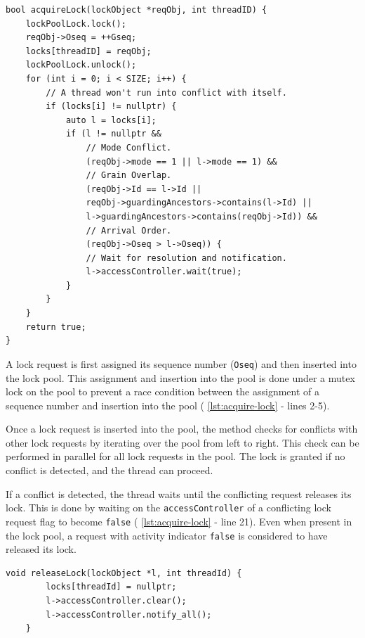 \begin{lstlisting}[caption={Acquiring a lock on \texttt{reqObj}}, label={lst:acquire-lock}]
bool acquireLock(lockObject *reqObj, int threadID) {
    lockPoolLock.lock();
    reqObj->Oseq = ++Gseq;
    locks[threadID] = reqObj;
    lockPoolLock.unlock();
    for (int i = 0; i < SIZE; i++) {
        // A thread won't run into conflict with itself.
        if (locks[i] != nullptr) {
            auto l = locks[i];
            if (l != nullptr &&
                // Mode Conflict.
                (reqObj->mode == 1 || l->mode == 1) &&
                // Grain Overlap.
                (reqObj->Id == l->Id ||
                reqObj->guardingAncestors->contains(l->Id) ||
                l->guardingAncestors->contains(reqObj->Id)) &&
                // Arrival Order.
                (reqObj->Oseq > l->Oseq)) {
                // Wait for resolution and notification.
                l->accessController.wait(true);
            }
        }
    }
    return true;
}
\end{lstlisting}

A lock request is first assigned its sequence number (\texttt{Oseq}) and then inserted into the lock pool. This assignment and insertion into the pool is done under a mutex lock on the pool to prevent a race condition between the assignment of a sequence number and insertion into the pool ( \cref{lst:acquire-lock} - lines 2-5).

Once a lock request is inserted into the pool, the method checks for conflicts with other lock requests by iterating over the pool from left to right. This check can be performed in parallel for all lock requests in the pool. The lock is granted if no conflict is detected, and the thread can proceed.

If a conflict is detected, the thread waits until the conflicting request releases its lock. This is done by waiting on the \texttt{accessController} of a conflicting lock request flag to become \texttt{false} ( \cref{lst:acquire-lock} - line 21). Even when present in the lock pool, a request with activity indicator \texttt{false} is considered to have released its lock.


\begin{lstlisting}[caption={Releasing a lock}, label={lst:release-lock}]
    void releaseLock(lockObject *l, int threadId) {
        locks[threadId] = nullptr;
        l->accessController.clear();
        l->accessController.notify_all();
    }
\end{lstlisting}

